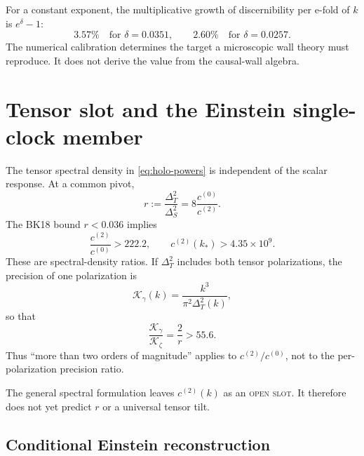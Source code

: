 \documentclass[11pt]{article}
\numberwithin{equation}{section}
\newcommand{\Kz}{\mathcal K_\zeta}
\newcommand{\cz}{c^{(0)}}
\newcommand{\ct}{c^{(2)}}
\newcommand{\status}[1]{\textsc{\footnotesize #1}}
\theoremstyle{definition}
\theoremstyle{remark}
\begin{document}
For a constant exponent, the multiplicative growth of discernibility per e-fold of $k$ is $e^\delta-1$:
\begin{equation}
3.57\%\quad\text{for }\delta=0.0351,
\qquad
2.60\%\quad\text{for }\delta=0.0257.
\end{equation}
The numerical calibration determines the target a microscopic wall theory must reproduce. It does not derive the value from the causal-wall algebra.

\section{Tensor slot and the Einstein single-clock member}
\label{sec:tensor}

The tensor spectral density in \cref{eq:holo-powers} is independent of the scalar response. At a common pivot,
\begin{equation}
\boxed{r:=\frac{\Delta_T^2}{\Delta_S^2}
=8\frac{\cz}{\ct}.}
\label{eq:r}
\end{equation}
The BK18 bound $r<0.036$ implies
\begin{equation}
\boxed{\frac{\ct}{\cz}>222.2,}
\qquad
\boxed{\ct(k_*)>4.35\times10^9.}
\end{equation}
These are spectral-density ratios. If $\Delta_T^2$ includes both tensor polarizations, the precision of one polarization is
\begin{equation}
\mathcal K_\gamma(k)=\frac{k^3}{\pi^2\Delta_T^2(k)},
\end{equation}
so that
\begin{equation}
\boxed{\frac{\mathcal K_\gamma}{\Kz}=\frac{2}{r}>55.6.}
\end{equation}
Thus ``more than two orders of magnitude'' applies to $\ct/\cz$, not to the per-polarization precision ratio.

The general spectral formulation leaves $\ct(k)$ as an \status{open slot}. It therefore does not yet predict $r$ or a universal tensor tilt.

\subsection{Conditional Einstein reconstruction}
\end{document}
